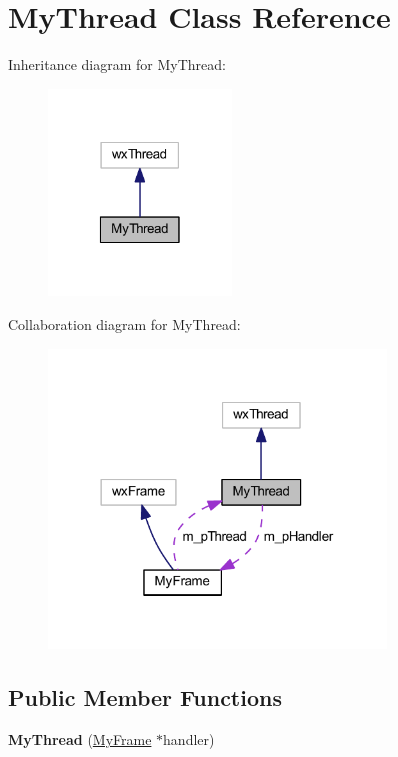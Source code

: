 \hypertarget{class_my_thread}{\section{My\-Thread Class Reference}
\label{class_my_thread}
}


Inheritance diagram for My\-Thread\-:
\nopagebreak
\begin{figure}[H]
\begin{center}
\leavevmode
\includegraphics[width=138pt]{class_my_thread__inherit__graph}
\end{center}
\end{figure}


Collaboration diagram for My\-Thread\-:
\nopagebreak
\begin{figure}[H]
\begin{center}
\leavevmode
\includegraphics[width=254pt]{class_my_thread__coll__graph}
\end{center}
\end{figure}
\subsection*{Public Member Functions}
\begin{DoxyCompactItemize}
\item 
\hypertarget{class_my_thread_aa6e966c01502e58062e1fd5f6327cc58}{{\bfseries My\-Thread} (\hyperlink{class_my_frame}{My\-Frame} $\ast$handler)}\label{class_my_thread_aa6e966c01502e58062e1fd5f6327cc58}

\end{DoxyCompactItemize}

